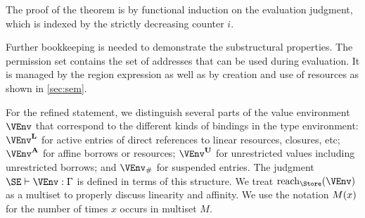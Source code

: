 The proof of the
theorem is by functional induction on the evaluation judgment, which
is indexed by the strictly decreasing counter $i$.

Further bookkeeping is needed to demonstrate the substructural
properties. The permission set contains the set
of addresses that can be used during evaluation. It is managed by the
region expression as well as by creation and use of resources as
shown in \cref{sec:sem}.

For the refined statement, we distinguish several parts of the value
environment $\VEnv$ that correspond to the different kinds of bindings in the
type environment: $\Active\VEnv$ for active entries of direct
references to linear resources, closures, etc; $\MutableBorrows\VEnv$ for 
affine borrows or resources;
$\ImmutableBorrows\VEnv$ for unrestricted values including
unrestricted borrows;
and $\Suspended\VEnv$ for suspended entries. The judgment
$\SE \vdash \VEnv:\E$ is defined in terms of this structure.
We treat
$\Reach\Store\VEnv$ as a multiset to properly discuss linearity and
affinity. We use the notation $\MultiNumber x M$ for the number of
times $x$ occurs in multiset $M$.



